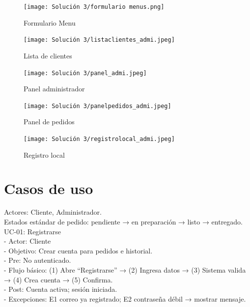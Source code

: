 \documentclass{article}
\begin{document}
\begin{doublespace}
    \begin{figure}[H]
        \centering
        \vspace*{1cm}
        \texttt{[image: Solución 3/formulario menus.png]}
        \caption{Formulario Menu}
        \label{fig:formulario-menu}
    \end{figure}
    \begin{figure}[H]
        \centering
        \vspace*{1cm}
        \texttt{[image: Solución 3/listaclientes\_admi.jpeg]}
        \caption{Lista de clientes}
        \label{fig:lista-clientes}
    \end{figure}
    \begin{figure}[H]
        \centering
        \vspace*{1cm}
        \texttt{[image: Solución 3/panel\_admi.jpeg]}
        \caption{Panel administrador}
        \label{fig:panel-admin}
    \end{figure}
    \begin{figure}[H]
        \centering
        \vspace*{1cm}
        \texttt{[image: Solución 3/panelpedidos\_admi.jpeg]}
        \caption{Panel de pedidos}
        \label{fig:panel-pedidos}
    \end{figure}
    \begin{figure}[H]
        \centering
        \vspace*{1cm}
        \texttt{[image: Solución 3/registrolocal\_admi.jpeg]}
        \caption{Registro local}
        \label{fig:registro-local}
    \end{figure}

     \section{Casos de uso}
    \noindent 
    Actores: Cliente, Administrador.\\
    Estados estándar de pedido: pendiente → en preparación → listo → entregado.\\
    
    UC-01: Registrarse\\
    - Actor: Cliente\\
    - Objetivo: Crear cuenta para pedidos e historial.\\
    - Pre: No autenticado.\\
    - Flujo básico: (1) Abre “Registrarse” → (2) Ingresa datos → (3) Sistema valida → (4) Crea cuenta → (5) Confirma.\\
    - Post: Cuenta activa; sesión iniciada.\\
    - Excepciones: E1 correo ya registrado; E2 contraseña débil → mostrar mensaje.\\
    

\end{doublespace}
\end{document}
